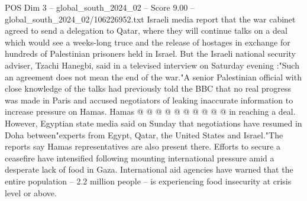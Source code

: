\begin{textsample}{POS Dim 3 – global\_south\_2024\_02 – Score 9.00 – global\_south\_2024\_02/106226952.txt}
Israeli media report that the war cabinet agreed to send a delegation to Qatar, where they will continue talks on a deal which would see a weeks-long truce and the release of hostages in exchange for hundreds of Palestinian prisoners held in Israel.
But the Israeli national security adviser, Tzachi Hanegbi, said in a televised interview on Saturday evening :"Such an agreement does not mean the end of the war."A senior Palestinian official with close knowledge of the talks had previously told the BBC that no real progress was made in Paris and accused negotiators of leaking inaccurate information to increase pressure on Hamas.
Hamas @ @ @ @ @ @ @ @ @ @ in reaching a deal.
However, Egyptian state media said on Sunday that negotiations have resumed in Doha between"experts from Egypt, Qatar, the United States and Israel."The reports say Hamas representatives are also present there.
Efforts to secure a ceasefire have intensified following mounting international pressure amid a desperate lack of food in Gaza.
International aid agencies have warned that the entire population -- 2.2 million people -- is experiencing food insecurity at crisis level or above.

\end{textsample}

